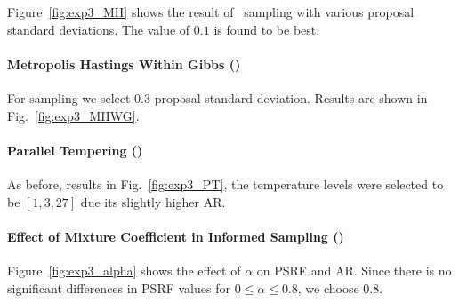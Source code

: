 Figure~\ref{fig:exp3_MH} shows the result of \MH~sampling with various
proposal standard deviations. The value of $0.1$ is found to be
best.

\paragraph{Metropolis Hastings Within Gibbs (\MHWG)}

For \MHWG sampling we select $0.3$ proposal standard
deviation. Results are shown in Fig.~\ref{fig:exp3_MHWG}.


\paragraph{Parallel Tempering (\PT)}

As before, results in Fig.~\ref{fig:exp3_PT}, the temperature levels
were selected to be $[1,3,27]$ due its slightly higher AR.

\paragraph{Effect of Mixture Coefficient in Informed Sampling (\MIXLMH)}

Figure~\ref{fig:exp3_alpha} shows the effect of $\alpha$ on PSRF and
AR. Since there is no significant differences in PSRF values for $0 \le
\alpha \le 0.8$, we choose $0.8$.


\begin{figure}[t]
\centering
\\
\\
\end{figure}


